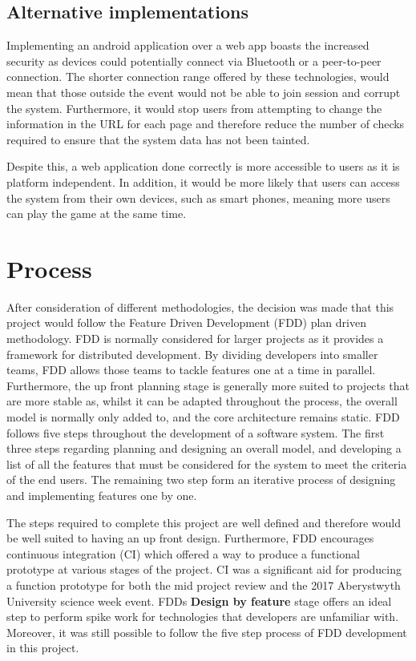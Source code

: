\subsection{Alternative implementations}
Implementing an android application over a web app boasts the increased security as devices could potentially connect via Bluetooth or a peer-to-peer connection. The shorter connection range offered by these technologies, would mean that those outside the event would not be able to join session and corrupt the system. Furthermore, it would stop users from attempting to change the information in the URL for each page and therefore reduce the number of checks required to ensure that the system data has not been tainted.

Despite this, a web application done correctly is more accessible to users as it is platform independent. In addition, it would be more likely that users can access the system from their own devices, such as smart phones, meaning more users can play the game at the same time.

\section{Process}
After consideration of different methodologies, the decision was made that this project would follow the Feature Driven Development (FDD) plan driven methodology. FDD is normally considered for larger projects as it provides a framework for distributed development. By dividing developers into smaller teams, FDD allows those teams to tackle features one at a time in parallel. Furthermore, the up front planning stage is generally more suited to projects that are more stable as, whilst it can be adapted throughout the process, the overall model is normally only added to, and the core architecture remains static. FDD follows five steps throughout the development of a software system. The first three steps regarding planning and designing an overall model, and developing a list of all the features that must be considered for the system to meet the criteria of the end users. The remaining two step form an iterative process of designing and implementing features one by one.

The steps required to complete this project are well defined and therefore would be well suited to having an up front design. Furthermore, FDD encourages continuous integration (CI) which offered a way to produce a functional prototype at various stages of the project. CI was a significant aid for producing a function prototype for both the mid project review and the 2017 Aberystwyth University science week event. FDDs \textbf{Design by feature} stage offers an ideal step to perform spike work for technologies that developers are unfamiliar with. Moreover, it was still possible to follow the five step process of FDD development in this project.

